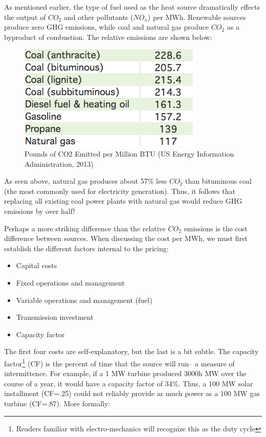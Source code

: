 \documentclass{article}
\begin{document}
As mentioned earlier, the type of fuel used as the heat source dramatically effects the output of $CO_2$ and other pollutants ($NO_x$) per MWh. Renewable sources produce zero GHG emissions, while coal and natural gas produce $CO_2$ as a byproduct of combustion. The relative emissions are shown below:

\begin{figure}[H]
	\begin{center}
	\includegraphics[scale = .75]{Figures/co2fuel.png}
	\caption{Pounds of CO2 Emitted per Million BTU (US Energy Information Administration, 2013)}
	\end{center}
\end{figure}

As seen above, natural gas produces about 57\% less $CO_2$ than bituminous coal (the most commonly used for electricity generation). Thus, it follows that replacing all existing coal power plants with natural gas would reduce GHG emissions by over half! \*

Perhaps a more striking difference than the relative $CO_2$ emissions is the cost difference between sources. When discussing the cost per MWh, we must first establish the different factors internal to the pricing:

\begin{itemize}
\item Capital costs 
\item Fixed operations and management 
\item Variable operations and management (fuel)
\item Transmission investment
\item Capacity factor
\end{itemize}

The first four costs are self-explanatory, but the last is a bit subtle. The capacity factor\footnote{Readers familiar with electro-mechanics will recognize this as the duty cycle} (CF) is the percent of time that the source will run-- a measure of intermittence. For example, if a 1 MW turbine produced 3000h MW over the course of a year, it would have a capacity factor of 34\%. Thus, a 100 MW solar installment (CF=.25) could not reliably provide as much power as a 100 MW gas turbine (CF=.87). 
More formally:
\end{document}
